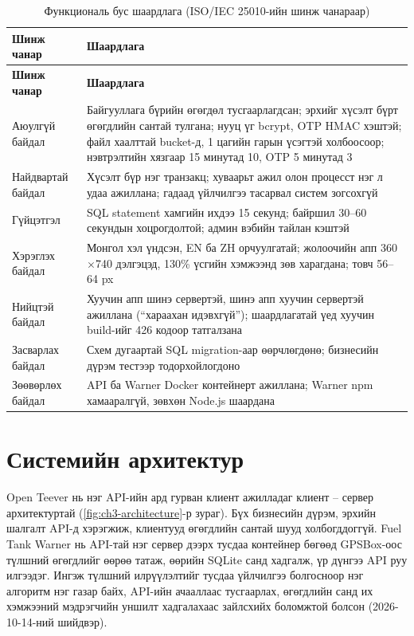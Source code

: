 \documentclass[
12pt,
oneside,
english,
onehalfspacing,
nolistspacing,
headsepline,
]{MUST-Thesis}
\begin{document}
{\small
\renewcommand{\arraystretch}{1.2}
\begin{longtable}{|L{3.4cm}|L{10.4cm}|}
\caption{Функциональ бус шаардлага (ISO/IEC 25010-ийн шинж чанараар)}\label{tab:ch3-nfr}\\
\hline
{}\textbf{Шинж чанар} & \textbf{Шаардлага} \\ \hline
\endfirsthead
\hline
{}\textbf{Шинж чанар} & \textbf{Шаардлага} \\ \hline
\endhead
Аюулгүй байдал & Байгууллага бүрийн өгөгдөл тусгаарлагдсан; эрхийг хүсэлт бүрт өгөгдлийн сантай тулгана; нууц үг bcrypt, OTP HMAC хэштэй; файл хаалттай bucket-д, 1 цагийн гарын үсэгтэй холбоосоор; нэвтрэлтийн хязгаар 15 минутад 10, OTP 5 минутад 3 \\ \hline
Найдвартай байдал & Хүсэлт бүр нэг транзакц; хуваарьт ажил олон процесст нэг л удаа ажиллана; гадаад үйлчилгээ тасарвал систем зогсохгүй \\ \hline
Гүйцэтгэл & SQL statement хамгийн ихдээ 15 секунд; байршил 30--60 секундын хоцрогдолтой; админ вэбийн тайлан кэштэй \\ \hline
Хэрэглэх байдал & Монгол хэл үндсэн, EN ба ZH орчуулгатай; жолоочийн апп 360$\times$740 дэлгэцэд, 130\% үсгийн хэмжээнд зөв харагдана; товч 56--64 px \\ \hline
Нийцтэй байдал & Хуучин апп шинэ сервертэй, шинэ апп хуучин сервертэй ажиллана (``хараахан идэвхгүй''); шаардлагатай үед хуучин build-ийг 426 кодоор татгалзана \\ \hline
Засварлах байдал & Схем дугаартай SQL migration-аар өөрчлөгдөнө; бизнесийн дүрэм тестээр тодорхойлогдоно \\ \hline
Зөөвөрлөх байдал & API ба Warner Docker контейнерт ажиллана; Warner npm хамааралгүй, зөвхөн Node.js шаардана \\ \hline
\end{longtable}
}

\section{Системийн архитектур}

Open Teever нь нэг API-ийн ард гурван клиент ажилладаг клиент -- сервер архитектуртай (\ref{fig:ch3-architecture}-р зураг). Бүх бизнесийн дүрэм, эрхийн шалгалт API-д хэрэгжиж, клиентууд өгөгдлийн сантай шууд холбогддоггүй. Fuel Tank Warner нь API-тай нэг сервер дээрх тусдаа контейнер бөгөөд GPSBox-оос түлшний өгөгдлийг өөрөө татаж, өөрийн SQLite санд хадгалж, үр дүнгээ API руу илгээдэг. Ингэж түлшний илрүүлэлтийг тусдаа үйлчилгээ болгосноор нэг алгоритм нэг газар байх, API-ийн ачааллаас тусгаарлах, өгөгдлийн санд их хэмжээний мэдрэгчийн уншилт хадгалахаас зайлсхийх боломжтой болсон (2026-10-14-ний шийдвэр).
\end{document}
